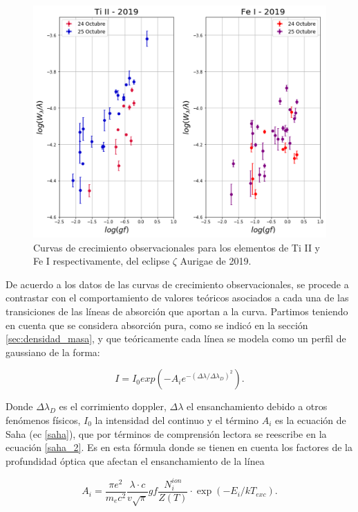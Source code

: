 \documentclass[12pt,oneside,openany,letter]{book}
\begin{document}
\begin{figure}[h]
    \centering
    \includegraphics[width=1\linewidth]{Gaficas/GoC_obs.png}
    \caption{Curvas de crecimiento observacionales para los elementos de Ti II y Fe I respectivamente, del eclipse $\zeta$ Aurigae de 2019.}
    \label{fig:GoC_obs}
\end{figure}



\noindent De acuerdo a los datos de las curvas de crecimiento observacionales, se procede a contrastar con el comportamiento de valores teóricos asociados a cada una de las transiciones de las líneas de absorción que aportan a la curva. Partimos teniendo en cuenta que se considera absorción pura, como se indicó en la sección \ref{sec:densidad_masa}, y que teóricamente cada línea se modela como un perfil de gaussiano de la forma:

\begin{equation*}
    I = I_0 exp\left(-A_ie^{-(\Delta\lambda/\Delta\lambda_D)^2}\right).
\end{equation*}

Donde $\Delta\lambda_D$ es el corrimiento doppler, $\Delta\lambda$ el ensanchamiento debido a otros fenómenos físicos, $I_0$ la intensidad del continuo y el término $A_i$ es la ecuación de Saha (ec \ref{saha}), que por términos de comprensión lectora se reescribe en la ecuación \ref{saha_2}. Es en esta fórmula donde se tienen en cuenta los factores de la profundidad óptica que afectan el ensanchamiento de la línea

\begin{equation}
    A_{i}=\frac{\pi e^{2}}{m_{e} c^{2}} \frac{\lambda \cdot c}{v \sqrt{\pi}} g f \frac{N_{i}^{i o n}}{Z(T)} \cdot \exp \left(-E_{i} / k T_{exc}\right). 
    \label{saha_2}
\end{equation}
\end{document}
